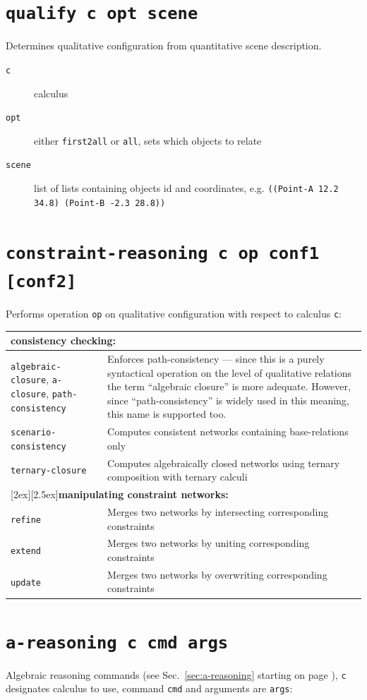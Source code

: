 \documentclass[headsepline]{scrreprt}
\theoremstyle{definition}
\begin{document}
\section*{\tt qualify c opt scene}
Determines qualitative configuration from quantitative scene description.
	\begin{description}
		\item[{\tt c}] calculus
		\item[{\tt opt}] either {\tt first2all} or {\tt all}, sets which objects to relate
		\item[{\tt scene}] list of lists containing objects id and coordinates, e.g. {\tt ((Point-A 12.2 34.8) (Point-B -2.3 28.8))}
	\end{description}

\section*{\tt constraint-reasoning c op conf1 [conf2]}

Performs operation {\tt op} on qualitative configuration with respect to calculus {\tt c}:
\begin{longtable}{|p{4.5cm}|p{9cm}|}
\hline
\multicolumn{2}{|l|}{\bf consistency checking:}\\ \hline
{\tt algebraic-closure}, {\tt a-closure}, {\tt path-consistency}  & Enforces path-consistency --- since this is a purely syntactical operation on the
					level of qualitative relations the term ``algebraic closure'' is more adequate.
					However, since ``path-consistency'' is widely used in this meaning, this name is
					supported too.\\
{\tt scenario-consistency} & Computes consistent networks containing base-relations only\\[0,5ex]
{\tt ternary-closure} & Computes algebraically closed networks using ternary composition with ternary calculi\\[1,0ex]
\hline
\multicolumn{2}{|l|}{\raisebox{-2ex}[2ex][2.5ex]{{\bf manipulating constraint networks:}}}\\ \hline
{\tt refine} & Merges two networks by intersecting corresponding constraints\\
{\tt extend} & Merges two networks by uniting corresponding constraints\\
{\tt update} & Merges two networks by overwriting corresponding constraints\\ \hline
\end{longtable}

\section*{\tt a-reasoning c cmd args}
Algebraic reasoning commands (see Sec.~\ref{sec:a-reasoning} starting on page \pageref{sec:a-reasoning}), {\tt c} designates calculus to use, command {\tt cmd} and arguments are {\tt args}:
\end{document}
